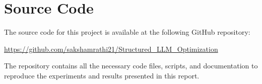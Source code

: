 \chapter{Source Code}
    
    The source code for this project is available at the following GitHub repository:
    
    \begin{center}
        \url{https://github.com/sakshamrathi21/Structured_LLM_Optimization}
    \end{center}
    
    The repository contains all the necessary code files, scripts, and documentation to reproduce the experiments and results presented in this report.